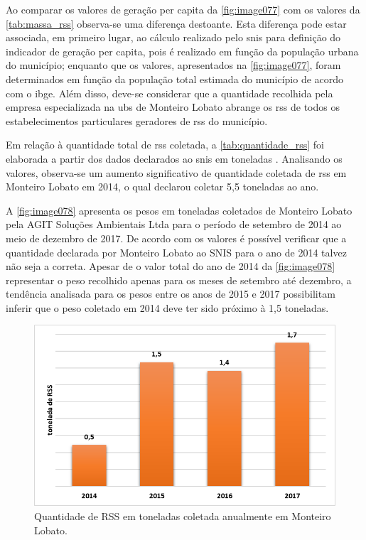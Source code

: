 	
	Ao comparar os valores de geração per capita da \autoref{fig:image077} com os valores da \autoref{tab:massa_rss} observa-se uma diferença destoante. Esta diferença pode estar associada, em primeiro lugar, ao cálculo realizado pelo \gls{snis} para definição do indicador de geração per capita, pois é realizado em função da população urbana do município; enquanto que os valores, apresentados na \autoref{fig:image077}, foram determinados em função da população total estimada do município de acordo com o \gls{ibge}. Além disso, deve-se considerar que a quantidade recolhida pela empresa especializada na \gls{ubs} de Monteiro Lobato abrange os \gls{rss} de todos os estabelecimentos particulares geradores de \gls{rss} do município. 
	
	Em relação à quantidade total de \gls{rss} coletada, a \autoref{tab:quantidade_rss} foi elaborada a partir dos dados declarados ao \gls{snis} em toneladas \cite{SNIS2016}. Analisando os valores, observa-se um aumento significativo de quantidade coletada de \gls{rss} em Monteiro Lobato em 2014, o qual declarou coletar 5,5 toneladas ao ano.
	
	
	
	A \autoref{fig:image078} apresenta os pesos em toneladas coletados de Monteiro Lobato pela AGIT Soluções Ambientais Ltda para o período de setembro de 2014 ao meio de dezembro de 2017. De acordo com os valores é possível verificar que a quantidade declarada por Monteiro Lobato ao SNIS para o ano de 2014 talvez não seja a correta. Apesar de o valor total do ano de 2014 da \autoref{fig:image078} representar o peso recolhido apenas para os meses de setembro até dezembro, a tendência analisada para os pesos entre os anos de 2015 e 2017 possibilitam inferir que o peso coletado em 2014 deve ter sido próximo à 1,5 toneladas.
	
	\begin{figure}
		\centering
		\includegraphics[width=0.75\linewidth]{produtos/prodtres/image078}
		\caption{Quantidade de RSS em toneladas coletada anualmente em Monteiro Lobato.}
		\label{fig:image078}
	\end{figure}
	
